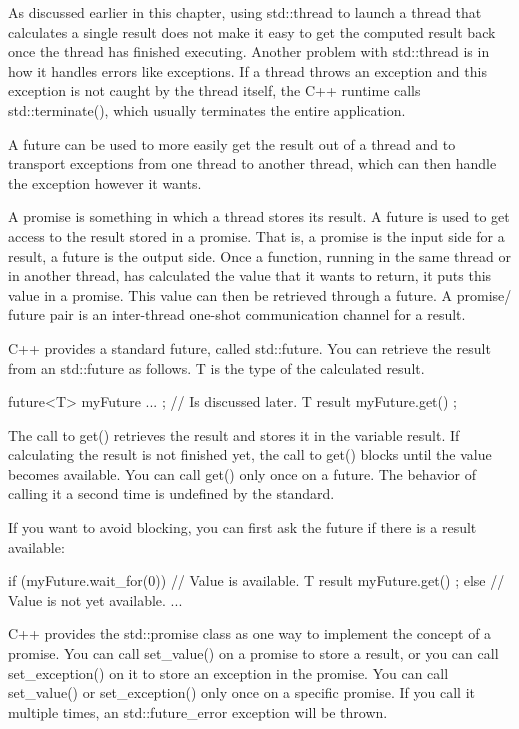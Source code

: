 
As discussed earlier in this chapter, using std::thread to launch a thread that calculates a single result does not make it easy to get the computed result back once the thread has finished executing. Another problem with std::thread is in how it handles errors like exceptions. If a thread throws an exception and this exception is not caught by the thread itself, the C++ runtime calls std::terminate(), which usually terminates the entire application.

A future can be used to more easily get the result out of a thread and to transport exceptions from one thread to another thread, which can then handle the exception however it wants.

A promise is something in which a thread stores its result. A future is used to get access to the result stored in a promise. That is, a promise is the input side for a result, a future is the output side. Once a function, running in the same thread or in another thread, has calculated the value that it wants to return, it puts this value in a promise. This value can then be retrieved through a future. A promise/ future pair is an inter-thread one-shot communication channel for a result.

C++ provides a standard future, called std::future. You can retrieve the result from an std::future as follows. T is the type of the calculated result.

\begin{cpp}
future<T> myFuture { ... }; // Is discussed later.
T result { myFuture.get() };
\end{cpp}

The call to get() retrieves the result and stores it in the variable result. If calculating the result is not finished yet, the call to get() blocks until the value becomes available. You can call get() only once on a future. The behavior of calling it a second time is undefined by the standard.

If you want to avoid blocking, you can first ask the future if there is a result available:

\begin{cpp}
if (myFuture.wait_for(0)) { // Value is available.
    T result { myFuture.get() };
} else { // Value is not yet available.
    ...
}
\end{cpp}


C++ provides the std::promise class as one way to implement the concept of a promise. You can call set\_value() on a promise to store a result, or you can call set\_exception() on it to store an exception in the promise. You can call set\_value() or set\_exception() only once on a specific promise. If you call it multiple times, an std::future\_error exception will be thrown.

